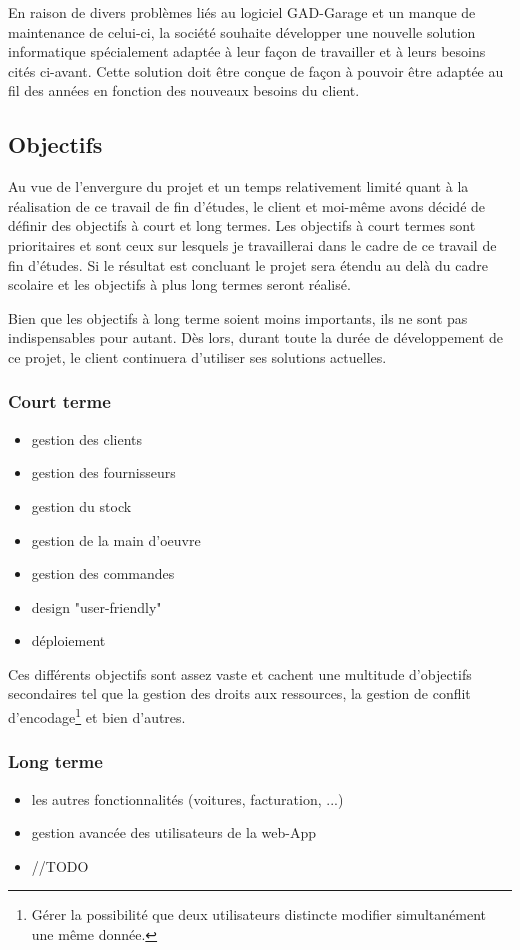 \newpara

En raison de divers problèmes liés au logiciel GAD-Garage et un manque de maintenance de celui-ci, la société souhaite développer une nouvelle solution informatique spécialement adaptée à leur façon de travailler et à leurs besoins cités ci-avant. Cette solution doit être conçue de façon à pouvoir être adaptée au fil des années en fonction des nouveaux besoins du client.

\subsection{Objectifs}

Au vue de l'envergure du projet et un temps relativement limité quant à la réalisation de ce travail de fin d'études, le client et moi-même avons décidé de définir des objectifs à court et long termes. Les objectifs à court termes sont prioritaires et sont ceux sur lesquels je travaillerai dans le cadre de ce travail de fin d'études. Si le résultat est concluant le projet sera étendu au delà du cadre scolaire et les objectifs à plus long termes seront réalisé. 

\newpara

Bien que les objectifs à long terme soient moins importants, ils ne sont pas indispensables pour autant. Dès lors, durant toute la durée de développement de ce projet, le client continuera d'utiliser ses solutions actuelles. 

\subsubsection{Court terme}

\begin{itemize}
  \item gestion des clients 
  \item gestion des fournisseurs
  \item gestion du stock
  \item gestion de la main d'oeuvre
  \item gestion des commandes 
  \item design "user-friendly"
  \item déploiement
\end{itemize}

\newpara

Ces différents objectifs sont assez vaste et cachent une multitude d'objectifs secondaires tel que la gestion des droits aux ressources, la gestion de conflit d'encodage\footnote{Gérer la possibilité que deux utilisateurs distincte modifier simultanément une même donnée.} et bien d'autres.  

\subsubsection{Long terme}

\begin{itemize}
  \item les autres fonctionnalités (voitures, facturation, ...)
  \item gestion avancée des utilisateurs de la web-App
  \item //TODO
\end{itemize}